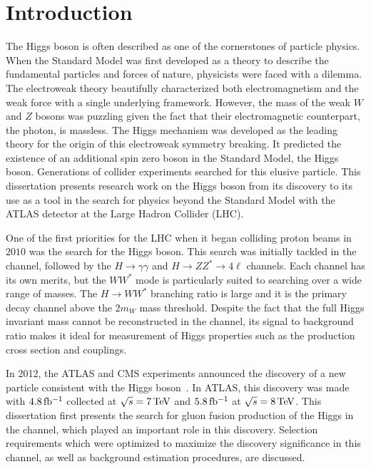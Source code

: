 \chapter{Introduction}
\label{introduction}

The Higgs boson is often described as one of the cornerstones of particle physics. When the Standard Model was first developed as a theory to describe the fundamental particles and forces of nature, physicists were faced with a dilemma. The electroweak theory beautifully characterized both electromagnetism and the weak force with a single underlying framework. However, the mass of the weak $W$ and $Z$ bosons was puzzling given the fact that their electromagnetic counterpart, the photon, is massless. The Higgs mechanism was developed as the leading theory for the origin of this electroweak symmetry breaking. It predicted the existence of an additional spin zero boson in the Standard Model, the Higgs boson. Generations of collider experiments searched for this elusive particle. This dissertation presents research work on the Higgs boson from its discovery to its use as a tool in the search for physics beyond the Standard Model with the ATLAS detector at the Large Hadron Collider (LHC). 

One of the first priorities for the LHC when it began colliding proton beams in $2010$ was the search for the Higgs boson. This search was initially tackled in the \HWWfull channel, followed by the $H\to \gamma\gamma$ and $H\to ZZ^* \to 4\ell $ channels. Each channel has its own merits, but the $WW^*$ mode is particularly suited to searching over a wide range of masses. The $H\to WW^*$ branching ratio is large and it is the primary decay channel above the $2m_W$ mass threshold. Despite the fact that the full Higgs invariant mass cannot be reconstructed in the \HWWfull channel, its signal to background ratio makes it ideal for measurement of Higgs properties such as the production cross section and couplings. 

In 2012, the ATLAS and CMS experiments announced the discovery of a new particle consistent with the Higgs boson~\cite{Discovery,CMSDiscovery}. In ATLAS, this discovery was made with $4.8 \mbox{\,fb$^{-1}$}$ collected at $\sqrt{s} = 7 \TeV$ and $5.8 \mbox{\,fb$^{-1}$}$ at $\sqrt{s} = 8 \TeV$. This dissertation first presents the search for gluon fusion production of the Higgs in the \HWWfull channel, which played an important role in this discovery. Selection requirements which were optimized to maximize the discovery significance in this channel, as well as background estimation procedures, are discussed. 

